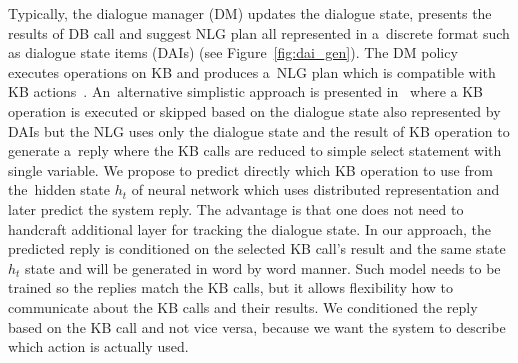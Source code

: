 \documentclass[11pt]{article}
\begin{document}
Typically, the dialogue manager (DM) updates the dialogue state, presents the results of DB call and suggest NLG plan all represented in a~discrete format such as dialogue state items (DAIs) (see Figure~\ref{fig:dai_gen}).
The DM policy executes operations on KB and produces a~NLG plan  which is compatible with KB actions~\cite{dusek_sequence2sequence_2016,young2010hidden}.
An~alternative simplistic approach is presented in~\cite{wen_networkbased_2016} where a KB operation is executed or skipped based on the dialogue state also represented by DAIs but the NLG uses only the dialogue state and the result of KB operation to generate a~reply where the KB calls are reduced to simple select statement with single variable.
We propose to predict directly which KB operation to use from the~hidden state $h_t$ of neural network which uses distributed representation and later predict the system reply.
The advantage is that one does not need to handcraft additional layer for tracking the dialogue state.
In our approach, the predicted reply is conditioned on the selected KB call's result and the same state $h_t$ state and will be generated in word by word manner.
Such model needs to be trained so the replies match the KB calls, but it allows flexibility how to communicate about the KB calls and their results.
We conditioned the reply based on the KB call and not vice versa, because we want the system to describe which action is actually used. 
\end{document}
